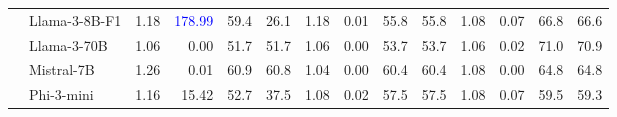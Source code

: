 \begin{table}[t]
{\begin{tabular}{l|l|rrrr|rrrr|rrrr}
                           & Llama-3-8B-F1             & 1.18                    & \textcolor{blue}{178.99}                  & 59.4                    & 26.1                   & 1.18                    & 0.01                    & 55.8                    & 55.8                   & 1.08                    & 0.07                    & 66.8                    & 66.6                  \\\cmidrule{2-14}
                           & Llama-3-70B        & 1.06                    & 0.00                    & 51.7                    & 51.7                   & 1.06                    & 0.00                    & 53.7                    & 53.7                   & 1.06                    & 0.02                    & 71.0                    & 70.9                  \\
                           & Mistral-7B         & 1.26                    & 0.01                    & 60.9                    & 60.8                   & 1.04                    & 0.00                    & 60.4                    & 60.4                   & 1.08                    & 0.00                    & 64.8                    & 64.8                  \\
                           & Phi-3-mini         & 1.16                    & 15.42                   & 52.7                    & 37.5                   & 1.08                    & 0.02                    & 57.5                    & 57.5                   & 1.08                    & 0.07                    & 59.5                    & 59.3                  \\

\end{tabular}}
\end{table}

